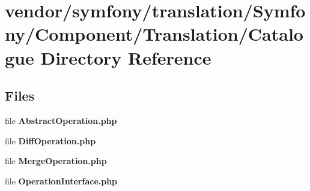 \section{vendor/symfony/translation/\+Symfony/\+Component/\+Translation/\+Catalogue Directory Reference}
\label{dir_59013f265f9c0cdd5771cd46ce11f35e}
\subsection*{Files}
\begin{DoxyCompactItemize}
\item 
file {\bf Abstract\+Operation.\+php}
\item 
file {\bf Diff\+Operation.\+php}
\item 
file {\bf Merge\+Operation.\+php}
\item 
file {\bf Operation\+Interface.\+php}
\end{DoxyCompactItemize}

